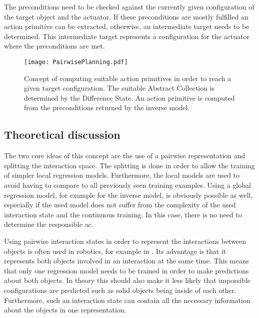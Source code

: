 The preconditions need to be checked against the currently given configuration of the target object and the actuator. If these preconditions are mostly fulfilled an action primitive can be extracted, otherwise, an intermediate target needs to be determined. This intermediate target represents a configuration for the actuator where the preconditions are met.

\begin{figure}
	\centering
	\texttt{[image: PairwisePlanning.pdf]}
	\caption{Concept of computing suitable action primitives in order to reach a given target configuration. The suitable Abstract Collection is determined by the Difference State. An action primitive is computed from the preconditions returned by the inverse model.} 
	\label{fig:PairPlanning}
\end{figure}


\subsection{Theoretical discussion}
The two core ideas of this concept are the use of a pairwise representation and splitting the interaction space. The splitting is done in order to allow the training of simpler local regression models. Furthermore, the local models are used to avoid having to compare to all previously seen training examples. 
Using a global regression model, for example for the inverse model, is obviously possible as well, especially if the used model does not suffer from the complexity of the used interaction state and the continuous training. In this case, there is no need to determine the responsible \acrlong{ac}.

Using pairwise interaction states in order to represent the interactions between objects is often used in robotics, for example in \cite{pairwiseExamples}. 
Its advantage is that it represents both objects involved in an interaction at the same time. This means that only one regression model needs to be trained in order to make predictions about both objects. In theory this should also make it less likely that impossible configurations are predicted such as solid objects being inside of each other. Furthermore, such an interaction state can contain all the necessary information about the objects in one representation. 

